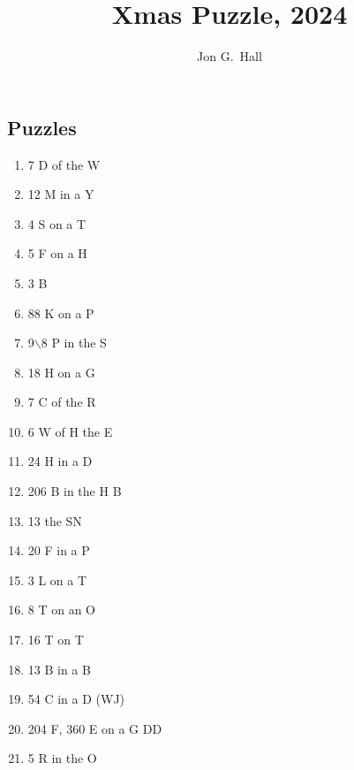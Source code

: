 \documentclass[10pt]{article}
\title{ Xmas Puzzle, 2024 }
\author{Jon G.~Hall}
\begin{document}
\maketitle

\begin{multicols}{4}

\newcommand{\w}[2]{#1}
\section*{Puzzles}



\begin{enumerate}[label=\arabic*.]
    \item 7 \w D{ays}  of the \w W{}
     \item 12 \w M{}  in a \w Y{}
     \item 4 \w S{}  on a \w T{}
     \item 5 \w F{}  on a \w H{}
     \item 3 \w BM{}
    
    \item 88 \w K{}  on a \w P{}
     \item 9\!\!\!$\backslash$8 \w P{}  in the \w SS{}
     \item 18 \w H{}  on a \w GC{}
     \item 7 \w C{}  of the \w R{}
     \item 6 \w W{}  of \w H{}  the \w E{}
     
    \item 24 \w H{}  in a \w D{}
     \item 206 \w B{}  in the \w H{}  B
    \item 13 the \w SPN{}
     \item 20 \w FP{}  in a \w P{}
     \item 3 \w L{}  on a \w T{}
     
    \item 8 \w T{}  on an \w O{}
     \item 16 \w T{}  on \w TO{}
     \item 13 \w B{}  in a \w BD{}
     \item 54 \w C{}  in a \w D{}  (WJ)
    \item 204 F, 360 \w E{}  on a \w G{reat} \w D{isnub}\w D{irhombidodecahedron}

    \item 5 \w R{}  in the \w O{}
     

\end{enumerate}
\end{multicols}
\end{document}
